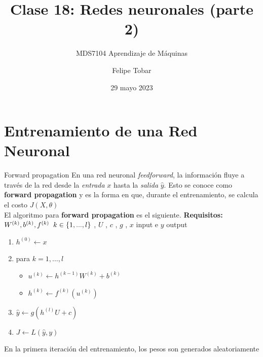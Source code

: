 \documentclass[handout, 9pt]{beamer}
\title{Clase 18: Redes neuronales (parte 2)}
\subtitle{MDS7104 Aprendizaje de Máquinas}
\date{29 mayo 2023}
\author{Felipe Tobar}
\institute{Iniciativa de Datos e Inteligencia Artificial\\Universidad de Chile}
\begin{document}
\begin{frame}
  \titlepage
\end{frame}

\section{Entrenamiento de una Red Neuronal}

\begin{frame}{Forward propagation}
En una red neuronal \textit{feedforward}, la información fluye a través de la red desde la \emph{entrada} $x$ hasta la \emph{salida} $\hat{y}$. Esto se conoce como \textbf{forward propagation} y es la forma en que, durante el entrenamiento, se calcula el costo $J(X, \theta)$\\
\vfill
El algoritmo para \textbf{forward propagation} es el siguiente. 
\newline
\hspace{0.5cm} \textbf{Requisitos: }   $W^{(k)} , b^{(k)} , f^{(k)} \hspace{0.2cm} k \in \{1,...,l\}$ , $U$ , $c$ , $g$ , $x$ input e $y$ output  \pause
\begin{enumerate}
  \item $h^{(0)} \gets x$ \pause
  \item para $k = 1 , \dots , l$
  \begin{itemize}
    \item $u^{(k)} \gets h^{(k-1)}W^{(k)} + b^{(k)}$ \pause
    \item $h^{(k)} \gets f^{(k)}(u^{(k)})$ \pause
  \end{itemize}
  \item $\hat{y} \gets g(h^{(l)}U + c)$ \pause
  \item $J \gets L(\hat{y},y)$ \pause

\end{enumerate}

\begin{observacion}
En la primera iteración del entrenamiento, los pesos son generados aleatoriamente
\end{observacion}

\end{frame}
\end{document}
